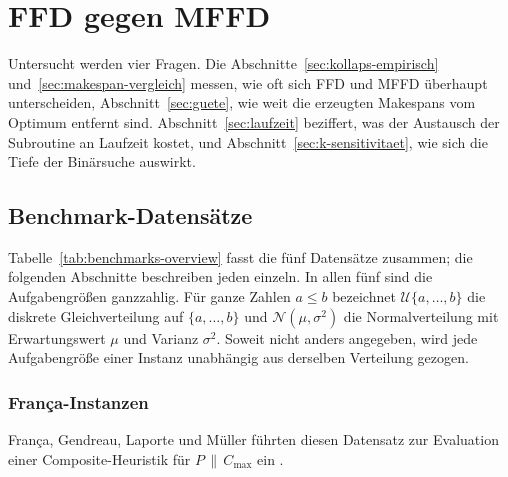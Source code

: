 \section{FFD gegen MFFD}
\label{sec:greedy}

Untersucht werden vier Fragen.
Die Abschnitte~\ref{sec:kollaps-empirisch} und~\ref{sec:makespan-vergleich} messen, wie oft sich
FFD und MFFD überhaupt unterscheiden, Abschnitt~\ref{sec:guete}, wie weit die erzeugten Makespans
vom Optimum entfernt sind.
Abschnitt~\ref{sec:laufzeit} beziffert, was der Austausch der Subroutine an Laufzeit kostet, und
Abschnitt~\ref{sec:k-sensitivitaet}, wie sich die Tiefe der Binärsuche auswirkt.

\subsection{Benchmark-Datensätze}
\label{sec:benchmarks}

Tabelle~\ref{tab:benchmarks-overview} fasst die fünf Datensätze zusammen; die folgenden
Abschnitte beschreiben jeden einzeln.
In allen fünf sind die Aufgabengrößen ganzzahlig.
Für ganze Zahlen $a \le b$ bezeichnet $\mathcal{U}\{a,\ldots,b\}$ die diskrete Gleichverteilung
auf $\{a,\ldots,b\}$ und $\mathcal{N}(\mu,\sigma^2)$ die Normalverteilung mit Erwartungswert
$\mu$ und Varianz $\sigma^2$.
Soweit nicht anders angegeben, wird jede Aufgabengröße einer Instanz unabhängig aus derselben
Verteilung gezogen.

\begin{table}[htbp]
\centering
\small

\caption{Übersicht der Benchmark-Datensätze. Angegeben sind jeweils die auftretenden Wertebereiche.
  $\rho = \sum_j p_j / (m \cdot p_{\max})$ ist die Größe aus Lemma~\ref{lem:kollaps}.
  OPT-Werte für Frangioni, Lawrinenko, Berndt und einen Teil der Planted-Instanzen stammen
  aus \textcite{akram2025}; die drei França-Werte wurden für diese Arbeit exakt berechnet
  (Abschnitt~\ref{sec:versuchsaufbau}).}
\label{tab:benchmarks-overview}
\end{table}

\subsubsection{França-Instanzen}
\label{sub:bench-franca}

França, Gendreau, Laporte und Müller führten diesen Datensatz zur Evaluation einer
Composite-Heuristik für $P\,\|\,C_{\max}$ ein \cite{franca1994}.

